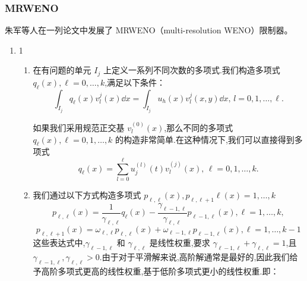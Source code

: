 \documentclass{book}
\begin{document}
\subsubsection{MRWENO}
朱军等人在一列论文\cite{MRWENO-1,MRWENO-2,MRWENO-3}中发展了 MRWENO（multi-resolution WENO）限制器。
\begin{enumerate}[label={{\bf Step \arabic*}:}]
    \item 1
          \begin{enumerate}[label={\bf Step 1.\arabic*.}]
              \item 在有问题的单元 $I_j$ 上定义一系列不同次数的多项式.我们构造多项式 $q_{\ell}(x), \ell=0, \ldots, k$,满足以下条件：
                    \begin{equation}
                        \int_{I_j} q_{\ell}(x) v_{l}^{j}(x) \dd x=\int_{I_j} u_{h}(x) v_{l}^{j}(x, y) \dd x,\, l=0,1, \ldots, \ell.
                    \end{equation}
                    \begin{remark}
                        如果我们采用规范正交基 $v_{l}^{(0)}(x)$,那么不同的多项式 $q_{\ell}(x), \ell=0,1, \ldots, k$ 的构造非常简单.在这种情况下,我们可以直接得到多项式
                        \begin{equation}
                            q_{\ell}(x)=\sum_{l=0}^{\ell} u_{j}^{(l)}(t) v_{l}^{(j)}(x),\,\ell=0,1,\ldots, k.
                        \end{equation}
                    \end{remark}
              \item 我们通过以下方式构造多项式 $p_{\ell, \ell}(x),p_{\ell,\ell+1} \ell(x)=1, \ldots, k$
                    \begin{equation}
                        p_{\ell, \ell}(x)=\frac{1}{\gamma_{\ell, \ell}} q_{\ell}(x)-\frac{\gamma_{\ell-1, \ell}}{\gamma_{\ell, \ell}} p_{\ell-1, \ell}(x), \ell=1, \ldots, k,
                    \end{equation}
                    \begin{equation}
                        p_{\ell, \ell+1}(x)=\omega_{\ell, \ell} p_{\ell, \ell}(x)+\omega_{\ell-1, \ell} p_{\ell-1, \ell}(x), \ell=1, \ldots, k-1
                    \end{equation}
                    这些表达式中,$\gamma_{\ell-1, \ell}$ 和 $\gamma_{\ell, \ell}$ 是线性权重,要求 $\gamma_{\ell-1, \ell}+\gamma_{\ell, \ell}=1$,且 $\gamma_{\ell-1, \ell},\gamma_{\ell, \ell}>0$.由于对于平滑解来说,高阶解通常是最好的,因此我们给予高阶多项式更高的线性权重,基于低阶多项式更小的线性权重.即：

\end{enumerate}
\end{enumerate}
\end{document}
